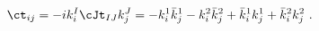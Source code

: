 \begin{equation}
\label{ctij}
\ct_{ij}=-ik^I_i\cJt_{IJ}k_j^J=-k_i^1\bar{k}_j^1-k_i^2\bar{k}_j^2
+\bar{k}_i^1k_j^1+\bar{k}_i^2k_j^2 \ .
\end{equation}

